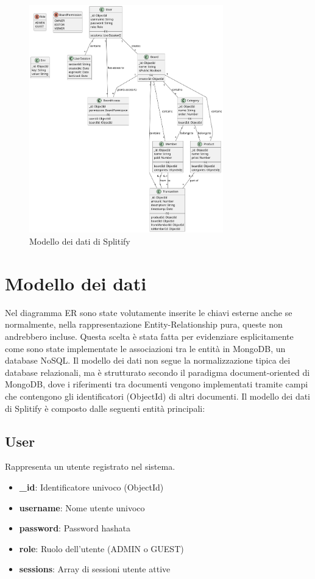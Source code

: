 \documentclass[11pt]{article}
\begin{document}
\begin{figure}[H]
    \centering
    \includegraphics[width=0.75\textwidth]{assets/dbmodel.png}
    \caption{Modello dei dati di Splitify}
\end{figure}

\section{Modello dei dati}

Nel diagramma ER sono state volutamente inserite le chiavi esterne anche se normalmente, nella rappresentazione Entity-Relationship pura, queste non andrebbero incluse. Questa scelta è stata fatta per evidenziare esplicitamente come sono state implementate le associazioni tra le entità in MongoDB, un database NoSQL. Il modello dei dati non segue la normalizzazione tipica dei database relazionali, ma è strutturato secondo il paradigma document-oriented di MongoDB, dove i riferimenti tra documenti vengono implementati tramite campi che contengono gli identificatori (ObjectId) di altri documenti.
Il modello dei dati di Splitify è composto dalle seguenti entità principali:

\subsection{User}
Rappresenta un utente registrato nel sistema.
\begin{itemize}
    \item \textbf{\_id}: Identificatore univoco (ObjectId)
    \item \textbf{username}: Nome utente univoco
    \item \textbf{password}: Password hashata
    \item \textbf{role}: Ruolo dell'utente (ADMIN o GUEST)
    \item \textbf{sessions}: Array di sessioni utente attive
\end{itemize}
\end{document}
